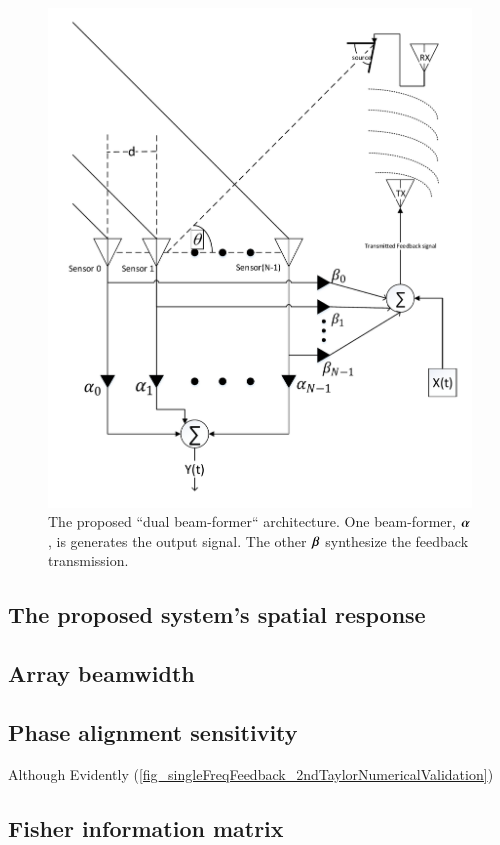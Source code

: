 \begin{figure}[!h]
\begin{center}
\includegraphics[width=0.75\linewidth]{./Media/SpatialIIR-diagram/SpatialIIR_VER5.pdf}
\caption{The proposed ``dual beam-former`` architecture. One beam-former, $\boldsymbol{\alpha}$, is generates the output signal. The other $\boldsymbol{\beta}$ synthesize the feedback transmission.}
\label{fig:Proposed_spatialIIR_ARCH}
\end{center}
\end{figure}
\subsection*{The proposed system's spatial response}

\subsection*{Array beamwidth}

\subsection*{Phase alignment sensitivity}
Although Evidently (\ref{fig_singleFreqFeedback_2ndTaylorNumericalValidation})
\subsection*{Fisher information matrix}
